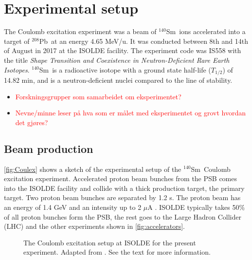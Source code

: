 \documentclass[twoside,english]{uiofysmaster/uiofysmaster}
\newcommand{\Sm}{$^{140}$Sm} %
\newcommand{\Pb}{$^{208}$Pb}
\let\orgautoref\autoref
\renewcommand{\autoref}
        {%
		 \def\sectionautorefname{Section}%
		 \def\subsectionautorefname{Section}%
		 \def\subsubsectionautorefname{Section}%
		 \def\chapterautorefname{Chapter}%
          \orgautoref}
\begin{document}
\section{Experimental setup}\label{sec:exp_setup}

The Coulomb excitation experiment was a beam of \Sm\ ions accelerated into a target of \Pb\ at an energy 4.65 MeV/u.
It was conducted between 8th and 14th of August in 2017 at the ISOLDE facility.
The experiment code was IS558 with the title \textit{Shape Transition and Coexistence in Neutron-Deficient Rare Earth Isotopes}.
\Sm\ is a radioactive isotope with a ground state half-life ($T_{1/2}$) of 14.82 min, and is a neutron-deficient nuclei compared to the line of stability.


\begin{itemize}
	\item \textcolor{red}{Forskningsgrupper som samarbeidet om eksperimentet?}
	\item \textcolor{red}{Nevne/minne leser på hva som er målet med eksperimentet og grovt hvordan det gjøres?}
\end{itemize}


\subsection{Beam production}\label{ssec:beam_prod}
\autoref{fig:Coulex} shows a sketch of the experimental setup of the \Sm\ Coulomb excitation experiment. 
Accelerated proton beam bunches from the PSB comes into the ISOLDE facility and collide with a thick production target, the primary target. 
Two proton beam bunches are separated by 1.2 s.
The proton beam has an energy of 1.4 GeV and an intensity up to 2 $\mu$A \cite{TIF, TIF2013}. 
ISOLDE typically takes 50\% \cite{MB-spect} of all proton bunches form the PSB, the rest goes to the Large Hadron Collider (LHC) and the other experiments shown in \autoref{fig:accelerators}. 

\begin{figure}[ht]
	\centering
	
	\caption{The Coulomb excitation setup at ISOLDE for the present experiment. 
	Adapted from \cite{Klintefjord}. 
	See the text for more information.}
	\label{fig:Coulex}
\end{figure}
\end{document}
